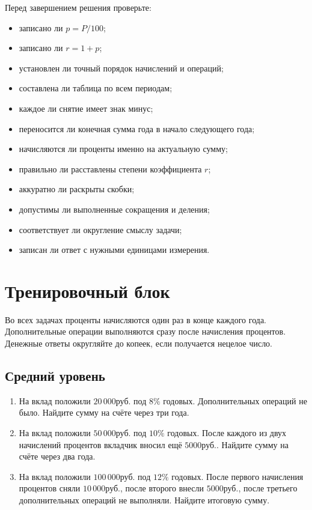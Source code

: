 \documentclass[a4paper,12pt]{article}
\newcommand{\RUB}{\text{руб.}}
\begin{document}
Перед завершением решения проверьте:

\begin{itemize}
  \item записано ли \(p=P/100\);
  \item записано ли \(r=1+p\);
  \item установлен ли точный порядок начислений и операций;
  \item составлена ли таблица по всем периодам;
  \item каждое ли снятие имеет знак минус;
  \item переносится ли конечная сумма года в начало следующего года;
  \item начисляются ли проценты именно на актуальную сумму;
  \item правильно ли расставлены степени коэффициента \(r\);
  \item аккуратно ли раскрыты скобки;
  \item допустимы ли выполненные сокращения и деления;
  \item соответствует ли округление смыслу задачи;
  \item записан ли ответ с нужными единицами измерения.
\end{itemize}

\clearpage
\section*{Тренировочный блок}

Во всех задачах проценты начисляются один раз в конце каждого года.
Дополнительные операции выполняются сразу после начисления процентов.
Денежные ответы округляйте до копеек, если получается нецелое число.

\subsection*{Средний уровень}

\begin{enumerate}[label=\textbf{\arabic*.}]

  \item На вклад положили \(20\,000\RUB\) под \(8\%\) годовых.
  Дополнительных операций не было. Найдите сумму на счёте через три года.

  \item На вклад положили \(50\,000\RUB\) под \(10\%\) годовых.
  После каждого из двух начислений процентов вкладчик вносил ещё
  \(5000\RUB\). Найдите сумму на счёте через два года.

  \item На вклад положили \(100\,000\RUB\) под \(12\%\) годовых.
  После первого начисления процентов сняли \(10\,000\RUB\), после второго
  внесли \(5000\RUB\), после третьего дополнительных операций не выполняли.
  Найдите итоговую сумму.

\end{enumerate}
\end{document}
